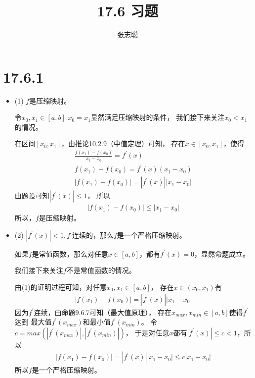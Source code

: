 \documentclass{article}
\begin{document}
\title{17.6 习题}
\author{张志聪}
\maketitle

\section*{17.6.1}

\begin{itemize}
  \item (1) $f$是压缩映射。

        令$x_0, x_1 \in [a, b]$
        $x_0 = x_1$显然满足压缩映射的条件，
        我们接下来关注$x_0 < x_1$的情况。

        在区间$[x_0, x_1]$，由推论10.2.9（中值定理）可知，
        存在$x \in [x_0, x_1]$，使得
        \begin{align*}
          \frac{f(x_1) - f(x_0)}{x_1 - x_0} = f^\prime(x) \\
          f(x_1) - f(x_0) = f^\prime(x)(x_1 - x_0)        \\
          |f(x_1) - f(x_0)| = |f^\prime(x)||x_1 - x_0|
        \end{align*}
        由题设可知$|f^\prime(x)| \leq 1$，
        所以
        \begin{align*}
          |f(x_1) - f(x_0)| \leq |x_1 - x_0|
        \end{align*}
        所以，$f$是压缩映射。

  \item (2) $|f^\prime(x)| < 1, f^\prime$连续的，那么$f$是一个严格压缩映射。

        如果$f$是常值函数，那么对任意$x \in [a, b]$，都有$f^\prime(x) = 0$，显然命题成立。

        我们接下来关注$f$不是常值函数的情况。

        由(1)的证明过程可知，对任意$x_0, x_1 \in [a, b]$，
        存在$x \in (x_0, x_1)$有
        \begin{align*}
          |f(x_1) - f(x_0)| = |f^\prime(x)||x_1 - x_0|
        \end{align*}
        因为$f^\prime$连续，由命题9.6.7可知（最大值原理），
        存在$x_{max}, x_{min} \in [a, b]$使得$f^\prime$达到
        最大值$f^\prime(x_{max})$和最小值$f^\prime(x_{min})$。
        令$c = max(|f^\prime(x_{max})|, |f^\prime(x_{min})|)$，
        于是对任意$x$都有$|f^\prime(x)| \leq c < 1$，所以
        \begin{align*}
          |f(x_1) - f(x_0)| = |f^\prime(x)||x_1 - x_0| \leq c |x_1 - x_0|
        \end{align*}
        所以$f$是一个严格压缩映射。

\end{itemize}
\end{document}
